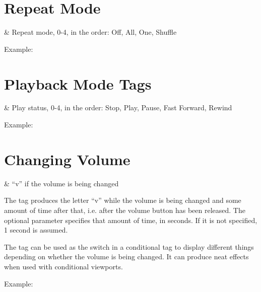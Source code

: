 \section{Repeat Mode}
\begin{table}
  \begin{tagmap}{}{}
     & Repeat mode, 0-4, in the order: Off, All, One, Shuffle
           \\
  \end{tagmap}
\end{table}
Example: 

\section{Playback Mode Tags}
\begin{table}
  \begin{tagmap}{}{}
     & Play status, 0-4, in the order: Stop, Play, Pause, 
           Fast Forward, Rewind\\
  \end{tagmap}
\end{table}
Example: 

\section{Changing Volume}
\begin{table}
  \begin{tagmap}{}{}
     & ``v'' if the volume is being changed\\
  \end{tagmap}
\end{table}

The tag produces the letter ``v'' while the volume is being changed and some
amount of time after that, i.e. after the volume button has been released. The
optional parameter  specifies that amount of time, in seconds. If it
is not specified, 1 second is assumed.

The tag can be used as the switch in a conditional tag to display different things
depending on whether the volume is being changed. It can produce neat effects
when used with conditional viewports.

Example: 

